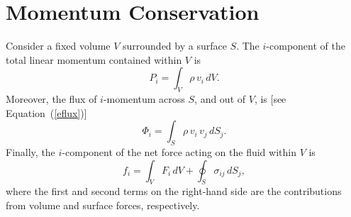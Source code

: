 \section{Momentum Conservation}\label{smom}
Consider a fixed volume $V$ surrounded by a surface $S$. The $i$-component of the total linear momentum contained within $V$
is
\begin{equation}
P_i = \int_V \rho\,v_i\,dV.
\end{equation}
Moreover, the flux of $i$-momentum across $S$, and out of $V$, is [see Equation~(\ref{eflux})]
\begin{equation}
\Phi_i = \int_S \rho\,v_i\,v_j\,dS_j.
\end{equation}
Finally, the  $i$-component of the net  force acting on the fluid within $V$ is
\begin{equation}
f_i = \int_V F_i\,dV + \oint_S \sigma_{ij}\,dS_j,
\end{equation}
where the first and second terms on the right-hand side are the contributions from volume and surface forces, respectively. 

